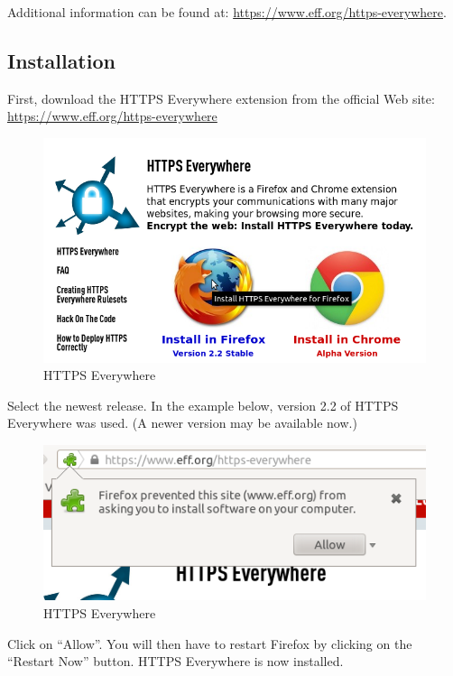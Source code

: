 Additional information can be found at:
\href{https://www.eff.org/https-everywhere}{https://www.eff.org/https-everywhere}.

\subsection{Installation}

First, download the HTTPS Everywhere extension from the official Web
site:
\href{https://www.eff.org/https-everywhere}{https://www.eff.org/https-everywhere}

\begin{figure}[htbp]
\centering
\includegraphics{https_everywhere.png}
\caption{HTTPS Everywhere}
\end{figure}

Select the newest release. In the example below, version 2.2 of HTTPS
Everywhere was used. (A newer version may be available now.)

\begin{figure}[htbp]
\centering
\includegraphics{https_everywhere_2.png}
\caption{HTTPS Everywhere}
\end{figure}

Click on ``Allow''. You will then have to restart Firefox by clicking on
the ``Restart Now'' button. HTTPS Everywhere is now installed.

